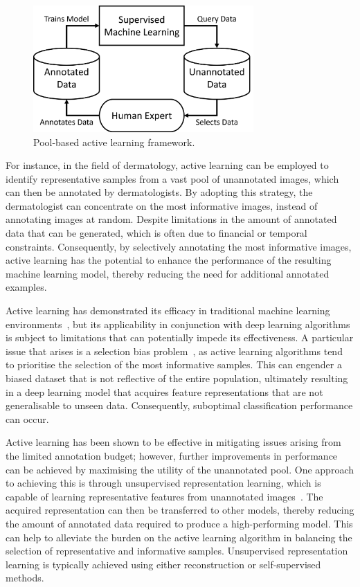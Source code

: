 \begin{figure}[b]
	\centering
	\includegraphics[width=0.75\textwidth]{images/active_learning.png}
	\caption{Pool-based active learning framework.}
	\label{fig:pool_based_active_learning}
\end{figure}

For instance, in the field of dermatology, active learning can be employed to identify representative samples from a vast pool of unannotated images, which can then be annotated by dermatologists. By adopting this strategy, the dermatologist can concentrate on the most informative images, instead of annotating images at random. Despite limitations in the amount of annotated data that can be generated, which is often due to financial or temporal constraints. Consequently, by selectively annotating the most informative images, active learning has the potential to enhance the performance of the resulting machine learning model, thereby reducing the need for additional annotated examples.

Active learning has demonstrated its efficacy in traditional machine learning environments~\citep{settles2009active}, but its applicability in conjunction with deep learning algorithms is subject to limitations that can potentially impede its effectiveness. A particular issue that arises is a selection bias problem~\citep{sener2017active}, as active learning algorithms tend to prioritise the selection of the most informative samples. This can engender a biased dataset that is not reflective of the entire population, ultimately resulting in a deep learning model that acquires feature representations that are not generalisable to unseen data. Consequently, suboptimal classification performance can occur.

Active learning has been shown to be effective in mitigating issues arising from the limited annotation budget; however, further improvements in performance can be achieved by maximising the utility of the unannotated pool. One approach to achieving this is through unsupervised representation learning, which is capable of learning representative features from unannotated images~\citep{bengio2013representation}. The acquired representation can then be transferred to other models, thereby reducing the amount of annotated data required to produce a high-performing model. This can help to alleviate the burden on the active learning algorithm in balancing the selection of representative and informative samples. Unsupervised representation learning is typically achieved using either reconstruction or self-supervised methods.


